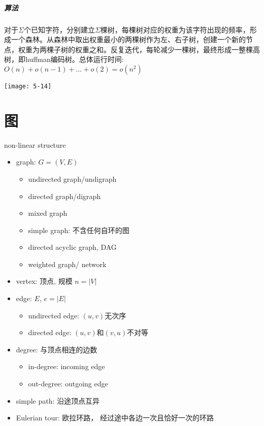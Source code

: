 \paragraph{算法}

对于$\Sigma$个已知字符，分别建立$\Sigma$棵树，每棵树对应的权重为该字符出现的频率，形成一个森林。从森林中取出权重最小的两棵树作为左、右子树，创建一个新的节点，权重为两棵子树的权重之和。反复迭代，每轮减少一棵树，最终形成一整棵高树，即huffman编码树。总体运行时间: $O(n)+o(n-1)+\ldots+o(2)=o\left(n^{2}\right)$

\texttt{[image: 5-14]}

\chapter{图}
non-linear structure


\begin{itemize}
\item graph: $G=(V, E)$
\begin{itemize}
\item undirected graph/undigraph
\item directed graph/digraph
\item mixed graph
\item simple graph: 不含任何自环的图
\item directed acyclic graph, DAG
\item weighted graph/ network 
\end{itemize}
\item vertex: 顶点, 规模 $n=|V|$
\item edge: $E$, $e=|E|$
\begin{itemize}
\item undirected edge: $(u,v)$无次序
\item directed edge: $(u,v)$和$(v,u)$不对等
\end{itemize}
\item degree: 与顶点相连的边数
\begin{itemize}
\item in-degree: incoming edge
\item out-degree: outgoing edge
\end{itemize}
\item simple path: 沿途顶点互异
\item Eulerian tour: 欧拉环路， 经过途中各边一次且恰好一次的环路
\end{itemize}


